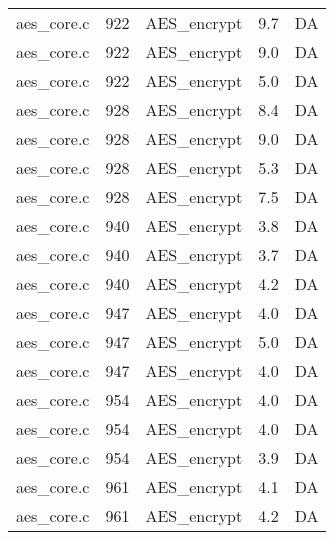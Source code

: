 \begin{table}[h!]
\begin{tabular}{lrlrr}
aes\_core.c& 922&AES\_encrypt&9.7 &DA\\
aes\_core.c& 922&AES\_encrypt&9.0 &DA\\
aes\_core.c& 922&AES\_encrypt&5.0 &DA\\
aes\_core.c& 928&AES\_encrypt&8.4 &DA\\
aes\_core.c& 928&AES\_encrypt&9.0 &DA\\
aes\_core.c& 928&AES\_encrypt&5.3 &DA\\
aes\_core.c& 928&AES\_encrypt&7.5 &DA\\
aes\_core.c& 940&AES\_encrypt&3.8 &DA\\
aes\_core.c& 940&AES\_encrypt&3.7 &DA\\
aes\_core.c& 940&AES\_encrypt&4.2 &DA\\
aes\_core.c& 947&AES\_encrypt&4.0 &DA\\
aes\_core.c& 947&AES\_encrypt&5.0 &DA\\
aes\_core.c& 947&AES\_encrypt&4.0 &DA\\
aes\_core.c& 954&AES\_encrypt&4.0 &DA\\
aes\_core.c& 954&AES\_encrypt&4.0 &DA\\
aes\_core.c& 954&AES\_encrypt&3.9 &DA\\
aes\_core.c& 961&AES\_encrypt&4.1 &DA\\
aes\_core.c& 961&AES\_encrypt&4.2 &DA\\
\hline
\end{tabular}
\renewcommand{\baselinestretch}{1.0}\selectfont
\end{table}
